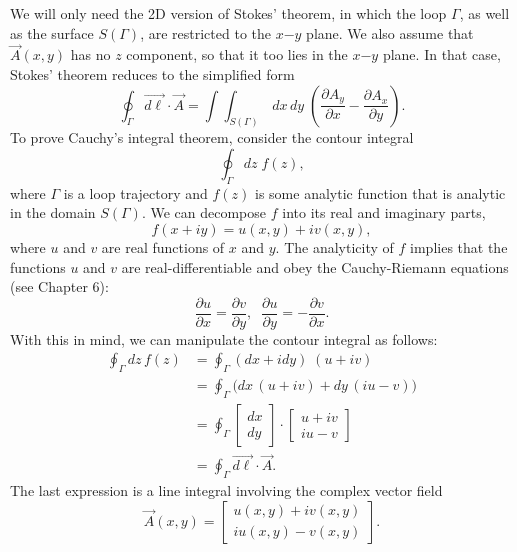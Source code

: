 \documentclass[10pt,a4paper]{article}
\begin{document}
We will only need the 2D version of Stokes' theorem, in which the loop
$\Gamma$, as well as the surface $S(\Gamma)$, are restricted to the
$x\mathrm{-}y$ plane. We also assume that $\vec{A}(x,y)$ has no $z$
component, so that it too lies in the $x\mathrm{-}y$ plane. In that
case, Stokes' theorem reduces to the simplified form
\begin{equation}
  \oint_\Gamma \vec{d\ell} \cdot \vec{A}
  = \int\!\!\int_{S(\Gamma)}\, dx \,dy \;
  \left(\frac{\partial A_y}{\partial x} - \frac{\partial A_x}{\partial y}\right).
\end{equation}
To prove Cauchy's integral theorem, consider the contour integral
\begin{equation}
  \oint_\Gamma dz \; f(z),
\end{equation}
where $\Gamma$ is a loop trajectory and $f(z)$ is some analytic
function that is analytic in the domain $S(\Gamma)$. We can decompose
$f$ into its real and imaginary parts,
\begin{equation}
  f(x+iy) = u(x,y) + iv(x,y),
\end{equation}
where $u$ and $v$ are real functions of $x$ and $y$. The analyticity
of $f$ implies that the functions $u$ and $v$ are real-differentiable
and obey the Cauchy-Riemann equations (see Chapter 6):
\begin{equation}
  \frac{\partial u}{\partial x}
  = \frac{\partial v}{\partial y},\;\; \frac{\partial u}{\partial y}
  = -\frac{\partial v}{\partial x}.
\end{equation}
With this in mind, we can manipulate the contour integral as follows:
\begin{align}
  \oint_\Gamma dz \, f(z) &= \oint_\Gamma \left(dx + i dy\right) \; \left(u + i v\right) \\
  &= \oint_\Gamma \Big(dx\, (u+iv) + dy\, (iu - v) \Big)  \\
  &= \oint_\Gamma \begin{bmatrix}dx\\dy\end{bmatrix} \cdot \begin{bmatrix}u + i v \\ iu - v\end{bmatrix}\\
      &= \oint_\Gamma \vec{d\ell} \cdot \vec{A}.
\end{align}
The last expression is a line integral involving the complex vector
field
\begin{equation}
  \vec{A}(x,y) = \begin{bmatrix}u(x,y) + i v(x,y) \\ iu(x,y) - v(x,y)\end{bmatrix}.
\end{equation}
\end{document}
